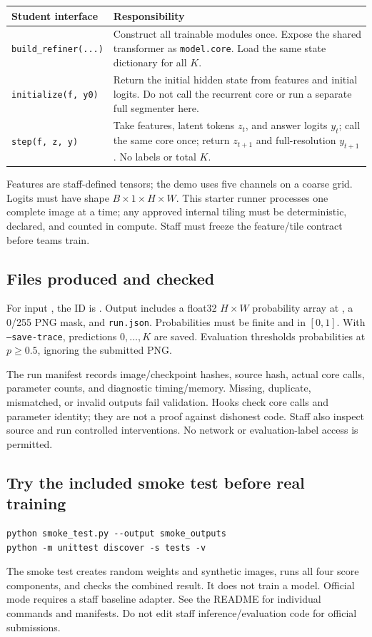 \documentclass[11pt,letterpaper]{article}
\newcommand{\smallnote}[1]{{\small\color{graytext}#1\par}}
\begin{document}
\begin{center}\small
\begin{tabularx}{\linewidth}{@{}>{\raggedright\arraybackslash}p{1.65in}Y@{}}
\toprule
Student interface & Responsibility\\\midrule
\texttt{build\_refiner(...)} & Construct all trainable modules once. Expose the shared transformer as \texttt{model.core}. Load the same state dictionary for all $K$.\\
\texttt{initialize(f, y0)} & Return the initial hidden state from features and initial logits. Do not call the recurrent core or run a separate full segmenter here.\\
\texttt{step(f, z, y)} & Take features, latent tokens $z_t$, and answer logits $y_t$; call the same core once; return $z_{t+1}$ and full-resolution $y_{t+1}$. No labels or total $K$.\\
\bottomrule
\end{tabularx}\end{center}
Features are staff-defined tensors; the demo uses five channels on a coarse grid. Logits must have shape $B\times1\times H\times W$. This starter runner processes one complete image at a time; any approved internal tiling must be deterministic, declared, and counted in compute. Staff must freeze the feature/tile contract before teams train.

\subsection{Files produced and checked}
For input , the ID is . Output includes a float32 $H\times W$ probability array at , a 0/255 PNG mask, and \texttt{run.json}. Probabilities must be finite and in $[0,1]$. With \texttt{--save-trace}, predictions $0,\ldots,K$ are saved. Evaluation thresholds probabilities at $p\geq0.5$, ignoring the submitted PNG.

The run manifest records image/checkpoint hashes, source hash, actual core calls, parameter counts, and diagnostic timing/memory. Missing, duplicate, mismatched, or invalid outputs fail validation. Hooks check core calls and parameter identity; they are not a proof against dishonest code. Staff also inspect source and run controlled interventions. No network or evaluation-label access is permitted.

\subsection{Try the included smoke test before real training}
\begin{lstlisting}
python smoke_test.py --output smoke_outputs
python -m unittest discover -s tests -v
\end{lstlisting}
\smallnote{The smoke test creates random weights and synthetic images, runs all four score components, and checks the combined result. It does not train a model. Official mode requires a staff baseline adapter. See the README for individual commands and manifests. Do not edit staff inference/evaluation code for official submissions.}
\end{document}
